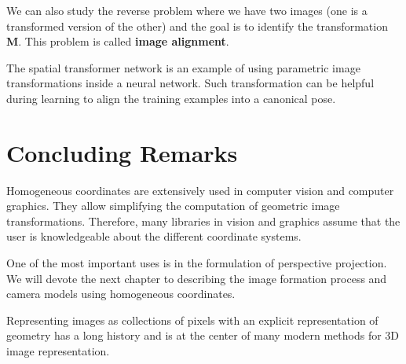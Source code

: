 

We can also study the reverse problem where we have two images (one is a transformed version of the other) and the goal is to identify the transformation $\mathbf{M}$. This problem is called {\bf image alignment}.



The spatial transformer network \cite{Jaderberg2015} is an example of using parametric image transformations inside a neural network. Such transformation can be helpful during learning to align the training examples into a canonical pose. 



\section{Concluding Remarks}


Homogeneous coordinates are extensively used in computer vision and computer graphics. They allow simplifying the computation of geometric image transformations. Therefore, many libraries in vision and graphics assume that the user is knowledgeable about the different coordinate systems.

One of the most important uses is in the formulation of perspective projection. We will devote the next chapter to describing the image formation process and camera models using homogeneous coordinates. 

Representing images as collections of pixels with an explicit representation of geometry has a long history and is at the center of many modern methods for 3D image representation. 





